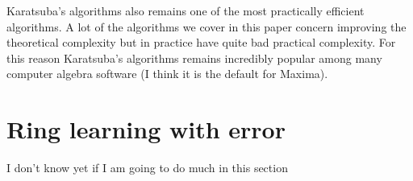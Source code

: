 Karatsuba's algorithms also remains one of the most practically efficient algorithms. A lot of the algorithms we cover in this paper concern improving the theoretical complexity but in practice have quite bad practical complexity. For this reason Karatsuba's algorithms remains incredibly popular among many computer algebra software (I think it is the default for Maxima).

\section{Ring learning with error}%
\label{sec:ring_learning_with_error}

I don't know yet if I am going to do much in this section

